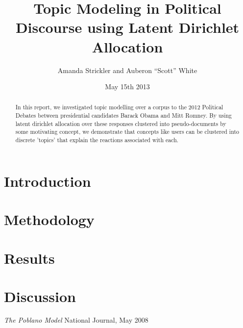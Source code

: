 \documentclass[12pt]{report}
\begin{document}
\title{Topic Modeling in Political Discourse using Latent Dirichlet Allocation}
\author{Amanda Strickler and Auberon ``Scott'' White}
\date{May 15th 2013}
\maketitle

\begin{abstract}
In this report, we investigated topic modelling over a corpus to the 2012 Political Debates between presidential candidates Barack Obama and Mitt Romney. By using latent dirichlet allocation over these responses clustered into pseudo-documents by some motivating concept, we demonstrate that concepts like users can be clustered into discrete 'topics' that explain the reactions associated with each.
\end{abstract}

\section{Introduction}
\label{sec:1}


\section{Methodology}
\label{sec:2}


\section{Results}
\label{sec:3}


\section{Discussion}
\label{sec:4}






\begin{thebibliography}{99}
  \emph{The Poblano Model}
  National Journal, May 2008


\end{thebibliography}
\end{document}
